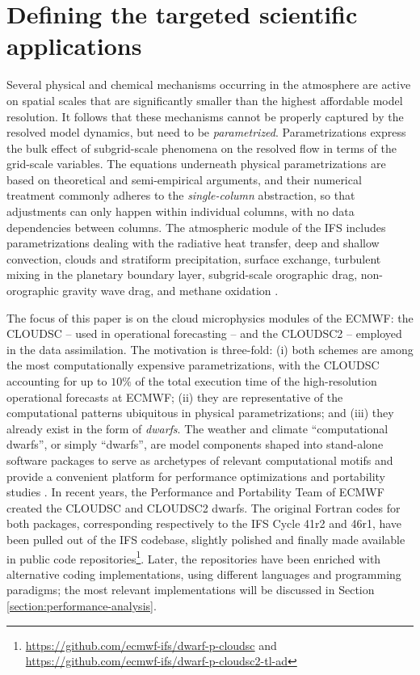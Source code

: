 \documentclass[main.tex]{subfiles}
\begin{document}
    \justifying

    \section{Defining the targeted scientific applications}
    \label{section:target-cloud-microphysics-schemes}

        Several physical and chemical mechanisms occurring in the atmosphere are active on spatial scales that are significantly smaller than the highest affordable model resolution. It follows that these mechanisms cannot be properly captured by the resolved model dynamics, but need to be \emph{parametrized}. Parametrizations express the bulk effect of subgrid-scale phenomena on the resolved flow in terms of the grid-scale variables. The equations underneath physical parametrizations are based on theoretical and semi-empirical arguments, and their numerical treatment commonly adheres to the \emph{single-column} abstraction, so that adjustments can only happen within individual columns, with no data dependencies between columns. The atmospheric module of the IFS includes parametrizations dealing with the radiative heat transfer, deep and shallow convection, clouds and stratiform precipitation, surface exchange, turbulent mixing in the planetary boundary layer, subgrid-scale orographic drag, non-orographic gravity wave drag, and methane oxidation \citep{ifs48r1}. 
        
        The focus of this paper is on the cloud microphysics modules of the ECMWF: the CLOUDSC -- used in operational forecasting -- and the CLOUDSC2 -- employed in the data assimilation. The motivation is three-fold: (i) both schemes are among the most computationally expensive parametrizations, with the CLOUDSC accounting for up to $10\%$ of the total execution time of the high-resolution operational forecasts at ECMWF; (ii) they are representative of the computational patterns ubiquitous in physical parametrizations; and (iii) they already exist in the form of \emph{dwarfs}. The weather and climate ``computational dwarfs'', or simply ``dwarfs'', are model components shaped into stand-alone software packages to serve as archetypes of relevant computational motifs \citep{muller19} and provide a convenient platform for performance optimizations and portability studies \citep{bauer20}. In recent years, the Performance and Portability Team of ECMWF created the CLOUDSC and CLOUDSC2 dwarfs. The original Fortran codes for both packages, corresponding respectively to the IFS Cycle 41r2 and 46r1, have been pulled out of the IFS codebase, slightly polished and finally made available in public code repositories\footnote{\url{https://github.com/ecmwf-ifs/dwarf-p-cloudsc} and \url{https://github.com/ecmwf-ifs/dwarf-p-cloudsc2-tl-ad}}. Later, the repositories have been enriched with alternative coding implementations, using different languages and programming paradigms; the most relevant implementations will be discussed in Section \ref{section:performance-analysis}.
\end{document}

